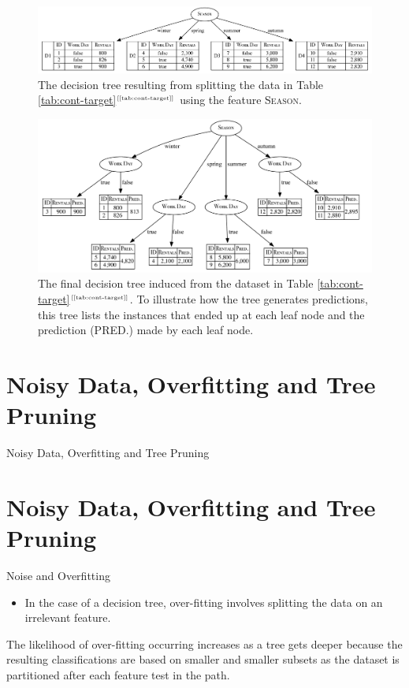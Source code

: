\documentclass[xcolor={table}]{beamer}
\newcommand{\SectionSlideShortHeader}[3][]{
	\ifthenelse{\isempty{#1}}
		{\section[#3]{#2}\begin{frame} \begin{center}\begin{huge}#2\end{huge}\end{center}\end{frame}}
		{\section[#1]{#2}\begin{frame} \begin{center}\begin{huge}#3\end{huge}\end{center}\end{frame}}
}
\newcommand{\featN}[1]{\textsc{#1}}
\newcommand{\ourRef}[1]{\ref{#1}$^{\text{\tiny[\pageref{#1}]}}$}
\begin{document}
 \begin{frame} 
\begin{figure}
\centerline{
	\includegraphics[width=\textwidth]{./images/ex-hand-id3-regression1_mod.pdf}
}
\caption{The decision tree resulting from splitting the data in Table \ourRef{tab:cont-target} using the feature \featN{Season}.}
\label{fig:ex-id3-regression-1}
\end{figure}
\end{frame} 



 \begin{frame} 
\begin{figure}
\centerline{
	\includegraphics[width=\textwidth]{./images/ex-hand-id3-regression-final_mod.pdf}
}
\caption{The final decision tree induced from the dataset in Table \ourRef{tab:cont-target}. To illustrate how the tree generates predictions, this tree lists the instances that ended up at each leaf node and the prediction (PRED.) made by each leaf node.}
\label{fig:ex-id3-regression-final}
\end{figure}
\end{frame} 


\SectionSlideShortHeader{Noisy Data, Overfitting and Tree Pruning}{Noise and Overfitting}

\begin{frame}
	\begin{itemize}
		\item In the case of a decision tree, over-fitting involves splitting the data on an irrelevant feature. 
	\end{itemize}
\begin{block}{}
The likelihood of over-fitting occurring increases as a tree gets deeper because the resulting classifications are based on smaller and smaller subsets as the dataset is partitioned after each feature test in the path.
\end{block}
\end{frame}
\end{document}
